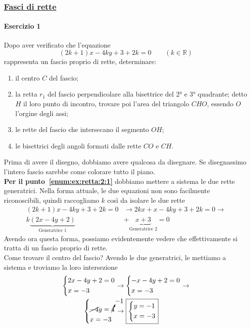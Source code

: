 \subsubsection*{\hyperref[subsec:geomanal:fasciorette]{Fasci di rette}}
\paragraph{Esercizio 1}
Dopo aver verificato che l'equazione
\begin{equation*}
(2k+1)x -4ky + 3 + 2k = 0 \qquad (k\in\mathbb{R})
\end{equation*}
rappresenta un fascio proprio di rette, determinare:
\begin{enumerate}
	\item il centro $C$ del fascio; \label{enum:ex:retta:2:1}
	\item la retta $r_1$ del fascio perpendicolare alla bisettrice del $\ang{2}$ e $\ang{3}$ quadrante;
	detto $H$ il loro punto di incontro, trovare poi l'area del triangolo $CHO$, essendo $O$ l'orgine
	degli assi;\label{enum:ex:retta:2:2}
	\item le rette del fascio che intersecano il segmento $OH$;\label{enum:ex:retta:2:3}
	\item le bisettrici degli angoli formati dalle rette $CO$ e $CH$.\label{enum:ex:retta:2:4}
\end{enumerate}
\divisor

Prima di avere il disegno, dobbiamo avere qualcosa da disegnare. Se disegnassimo l'intero fascio 
sarebbe come colorare tutto il piano.\\
\textbf{Per il punto~\ref{enum:ex:retta:2:1}} dobbiamo mettere a sistema le due rette generatrici.
Nella forma attuale, le due equazioni non sono facilmente riconoscibili, quindi raccogliamo $k$ così
da isolare le due rette
\begin{align*}
(2k+1)x -4ky + 3 + 2k = 0 &\rightarrow 2kx+x-4ky+3+2k = 0 \rightarrow\\
k\underbrace{(2x-4y+2)}_{\text{Generatrice 1}}&+\underbrace{x+3}_{\text{Generatrice 2}} = 0
\end{align*}
Avendo ora questa forma, possiamo evidentemente vedere che effettivamente si tratta di un fascio 
proprio di rette.\\
Come trovare il centro del fascio? Avendo le due generatrici, le mettiamo a sistema e troviamo la loro
intersezione
\begin{align*}
\begin{dcases}
2x-4y+2=0\\
x=-3
\end{dcases} &\rightarrow
\begin{dcases}
-x-4y+2=0\\
x=-3
\end{dcases} \rightarrow\\
\begin{dcases}
\cancel{-4}y = \cancelto{-1}{4}\\
x=-3
\end{dcases} &\rightarrow
\boxed{\begin{dcases}
y = -1\\
x = -3
\end{dcases}}
\end{align*}

